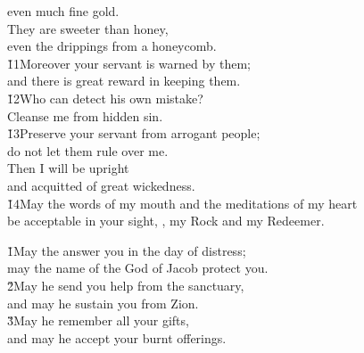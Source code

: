 \begin{poetry}
\poemll    even much fine gold. \\
\poeml They are sweeter than honey, \\
\poemll    even the drippings from a honeycomb. \\
\poeml \v{11}Moreover your servant is warned by them; \\
\poemll    and there is great reward in keeping them. \\
\poeml \v{12}Who can detect his own mistake? \\
\poemll    Cleanse me from hidden sin. \\
\poeml \v{13}Preserve your servant from arrogant people; \\
\poemll    do not let them rule over me. \\
\poeml Then I will be upright \\
\poemll    and acquitted of great wickedness. \\
\poeml \v{14}May the words of my mouth and the meditations of my heart \\
\poemll    be acceptable in your sight, , my Rock and my Redeemer.
\end{poetry}

\begin{poetry}
\poeml \v{1}May the  answer you in the day of distress; \\
\poemll    may the name of the God of Jacob protect you. \\
\poeml \v{2}May he send you help from the sanctuary, \\
\poemll    and may he sustain you from Zion. \\
\poeml \v{3}May he remember all your gifts, \\
\poemll    and may he accept your burnt offerings.
\end{poetry}

